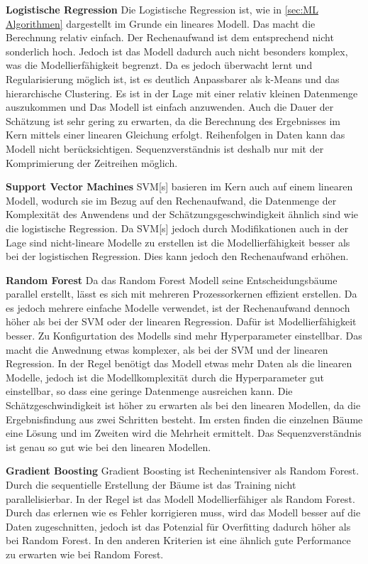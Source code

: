 \textbf{Logistische Regression}
Die Logistische Regression ist, wie in \ref{sec:ML Algorithmen} dargestellt im Grunde ein lineares Modell. Das macht die Berechnung relativ einfach. Der Rechenaufwand ist dem entsprechend nicht sonderlich hoch. Jedoch ist das Modell dadurch auch nicht besonders komplex, was die Modellierfähigkeit begrenzt. Da es jedoch überwacht lernt und Regularisierung möglich ist, ist es deutlich Anpassbarer als k-Means und das hierarchische Clustering. Es ist in der Lage mit einer relativ kleinen Datenmenge auszukommen und Das Modell ist einfach anzuwenden. Auch die Dauer der Schätzung ist sehr gering zu erwarten, da die Berechnung des Ergebnisses im Kern mittels einer linearen Gleichung erfolgt. Reihenfolgen in Daten kann das Modell nicht berücksichtigen. Sequenzverständnis ist deshalb nur mit der Komprimierung der Zeitreihen möglich.\par

\textbf{Support Vector Machines}
\acrshort{SVM}[s] basieren im Kern auch auf einem linearen Modell, wodurch sie im Bezug auf den Rechenaufwand, die Datenmenge der Komplexität des Anwendens und der Schätzungsgeschwindigkeit ähnlich sind wie die logistische Regression. Da \acrshort{SVM}[s] jedoch durch Modifikationen auch in der Lage sind nicht-lineare Modelle zu erstellen ist die Modellierfähigkeit besser als bei der logistischen Regression. Dies kann jedoch den Rechenaufwand erhöhen.\par

\textbf{Random Forest}
Da das Random Forest Modell seine Entscheidungsbäume parallel erstellt, lässt es sich mit mehreren Prozessorkernen effizient erstellen. Da es jedoch mehrere einfache Modelle verwendet, ist der Rechenaufwand dennoch höher als bei der \acrshort{SVM} oder der linearen Regression. Dafür ist Modellierfähigkeit besser. Zu Konfigurtation des Modells sind mehr Hyperparameter einstellbar. Das macht die Anwednung etwas komplexer, als bei der SVM und der linearen Regression. In der Regel benötigt das Modell etwas mehr Daten als die linearen Modelle, jedoch ist die Modellkomplexität durch die Hyperparameter gut einstellbar, so dass eine geringe Datenmenge ausreichen kann. Die Schätzgeschwindigkeit ist höher zu erwarten als bei den linearen Modellen, da die Ergebnisfindung aus zwei Schritten besteht. Im ersten finden die einzelnen Bäume eine Lösung und im Zweiten wird die Mehrheit ermittelt. Das Sequenzverständnis ist genau so gut wie bei den linearen Modellen.\par

\textbf{Gradient Boosting}
Gradient Boosting ist Rechenintensiver als Random Forest. Durch die sequentielle Erstellung der Bäume ist das Training nicht parallelisierbar. In der Regel ist das Modell Modellierfähiger als Random Forest. Durch das erlernen wie es Fehler korrigieren muss, wird das Modell besser auf die Daten zugeschnitten, jedoch ist das Potenzial für Overfitting dadurch höher als bei Random Forest. In den anderen Kriterien ist eine ähnlich gute Performance zu erwarten wie bei Random Forest.\par

